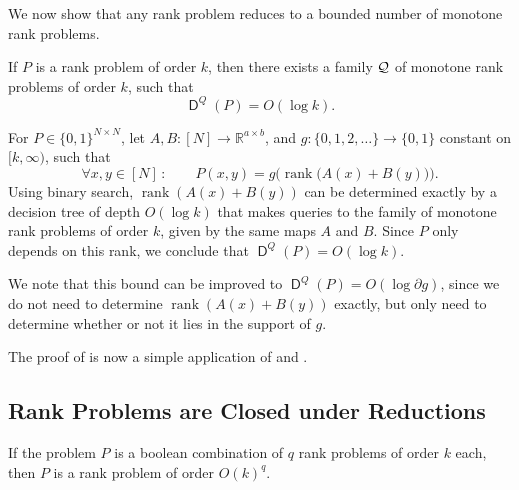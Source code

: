 \documentclass[conference]{IEEEtran}
\DeclareMathOperator{\rank}{rank}
\DeclareMathOperator{\D}{\mathsf{D}}
\newcommand{\R}{\mathbb{R}}
\begin{document}
We now show that any rank problem reduces to a bounded number of monotone rank problems.

\begin{lemma}
If $P$ is a rank problem of order $k$, then there exists a family $\mathcal{Q}$
of monotone rank problems of order $k$, such that
\[
    \D^Q(P) = O(\log k).
\]
\end{lemma}

\begin{IEEEproof}
	For $P\in\{0,1\}^{N\times N}$, let $A,B\colon [N] \to \R^{a\times b}$, and $g\colon \{0,1,2,\dots\}\to \{0,1\}$ constant on $[k,\infty )$, such that
\[
	\forall x,y\in[N]\,\colon\qquad P(x,y) = g\Big(\rank\!\big(A(x)+B(y)\big)\Big).
\]
	Using binary search, $\rank(A(x)+B(y))$ can be determined exactly by a decision tree of depth $O(\log k)$ that makes queries to the family of monotone rank problems of order $k$, given by the same maps $A$ and $B$. Since $P$ only depends on this rank, we conclude that $\D^Q(P) = O(\log k)$.
	
	We note that this bound can be improved to $\D^Q(P) = O(\log \partial g)$, since we do not need to determine $\rank(A(x)+B(y))$ exactly, but only need to determine whether or not it lies in the support of $g$.
\end{IEEEproof}

The proof of  is now a simple application of  and .

\subsection{Rank Problems are Closed under Reductions}
\label{section:rank-closure-reductions}

\begin{lemma}
\label{thm:rank-problem-reduction}
If the problem $P$ is a boolean combination of $q$ rank problems of order $k$
each, then $P$ is a rank problem of order $O(k)^q$.
\end{lemma}
\end{document}
